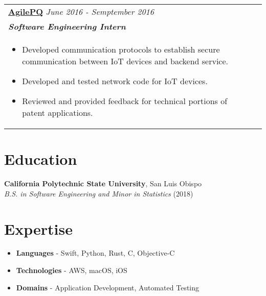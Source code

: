 \documentclass[10pt]{article}
\begin{document}
\begin{tabularx}{\linewidth}{ @{}l r@{} }
\textbf{\uline{AgilePQ}} \hfill \textit{June 2016 - Semptember 2016}\\[4pt]
\textbf{\textit{Software Engineering Intern}}\\[5pt]
\begin{minipage}[t]{\linewidth}
\begin{itemize}[leftmargin=2em, nosep, after=\strut, itemsep=2pt]
\item Developed communication protocols to establish secure communication between IoT devices and backend service.
\item Developed and tested network code for IoT devices.
\item Reviewed and provided feedback for technical portions of patent applications.
\end{itemize}
\end{minipage}
\end{tabularx}

\section{Education}
\textbf{California Polytechnic State University}, San Luis Obispo\\
\textit{B.S. in Software Engineering and Minor in Statistics} (2018)

\section{Expertise}
\begin{itemize}[leftmargin=2em, nosep, after=\strut, itemsep=2pt]
\item \textbf{Languages} - Swift, Python, Rust, C, Objective-C
\item \textbf{Technologies} - AWS, macOS, iOS
\item \textbf{Domains} - Application Development, Automated Testing
\end{itemize}
\end{document}
